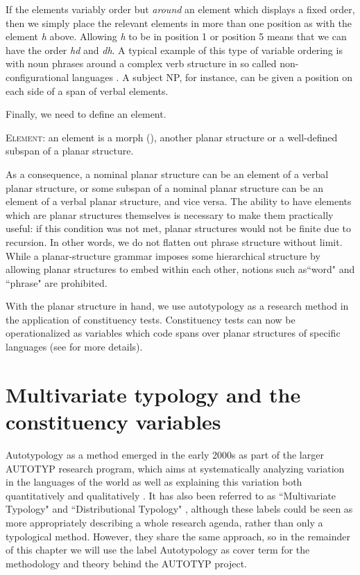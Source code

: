 \documentclass[output=paper,draftmode]{langscibook}
\begin{document}
If the elements variably order but \textit{around} an element which displays a fixed order, then we simply place the relevant elements in more than one position as with the element \textit{h} above. Allowing \textit{h} to be in position 1 or position 5 means that we can have the order \textit{hd} and \textit{dh}. A typical example of this type of variable ordering is with noun phrases around a complex verb structure in so called non-configurational languages \citep{austin1996non}. A subject NP, for instance, can be given a position on each side of a span of verbal elements. 

Finally, we need to define an element.

\ea
\textsc{Element}: an element is a morph (\cite{haspelmath2020morph}), another planar structure or a well-defined subspan of a planar structure.
\z 

As a consequence, a nominal planar structure can be an element of a verbal planar structure, or some subspan of a nominal planar structure can be an element of a verbal planar structure, and vice versa. The ability to have elements which are planar structures themselves is necessary to make them practically useful: if this condition was not met, planar structures would not be finite due to recursion. In other words, we do not flatten out phrase structure without limit.
While a planar-structure grammar imposes some hierarchical structure by allowing planar structures to embed within each other, notions such as``word" and ``phrase" are prohibited. 

\hspace*{-.4pt}With the planar structure in hand, we use autotypology as a research method in the application of constituency tests. Constituency tests can now be operationalized as variables which code spans over planar structures of specific languages (see  for more details).


\section{Multivariate typology and the constituency variables}
\label{sec:multivariatetypologyconstituencyvariables}

Autotypology as a method emerged in the early 2000s as part of the larger AUTOTYP research program, which aims at systematically analyzing variation in the languages of the world as well as explaining this variation both quantitatively and qualitatively \citep{bickel2002autotypologizing, bickel2017autotyp, witzlack2022managing}.
It has also been referred to as ``Multivariate Typology" and ``Distributional Typology" \citep{bickel2015distributional}, although these labels could be seen as more appropriately describing a whole research agenda, rather than only a typological method.
However, they share the same approach, so in the remainder of this chapter we will use the label Autotypology as cover term for the methodology and theory behind the AUTOTYP project.
\end{document}
